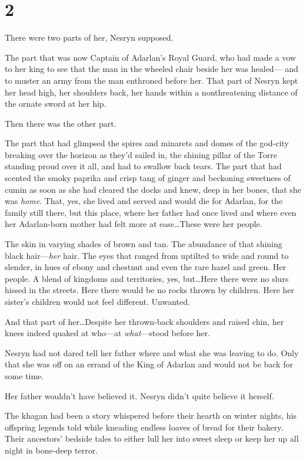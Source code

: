 
\chapter{2}

There were two parts of her, Nesryn supposed.

The part that was now Captain of Adarlan's Royal Guard, who had made a vow to her king to see that the man in the wheeled chair beside her was healed--- and to muster an army from the man enthroned before her.
That part of Nesryn kept her head high, her shoulders back, her hands within a nonthreatening distance of the ornate sword at her hip.

Then there was the other part.

The part that had glimpsed the spires and minarets and domes of the god-city breaking over the horizon as they'd sailed in, the shining pillar of the Torre standing proud over it all, and had to swallow back tears.
The part that had scented the smoky paprika and crisp tang of ginger and beckoning sweetness of cumin as soon as she had cleared the docks and knew, deep in her bones, that she was \emph{home}.
That, yes, she lived and served and would die for Adarlan, for the family still there, but this place, where her father had once lived and where even her Adarlan-born mother had felt more at ease\ldots These were her people.

The skin in varying shades of brown and tan.
The abundance of that shining black hair---\emph{her} hair.
The eyes that ranged from uptilted to wide and round to slender, in hues of ebony and chestnut and even the rare hazel and green.
Her people.
A blend of kingdoms and territories, yes, but\ldots Here there were no slurs hissed in the streets.
Here there would be no rocks thrown by children.
Here her sister's children would not feel different.
Unwanted.

And that part of her\ldots Despite her thrown-back shoulders and raised chin, her knees indeed quaked at who---at \emph{what}---stood before her.

Nesryn had not dared tell her father where and what she was leaving to do.
Only that she was off on an errand of the King of Adarlan and would not be back for some time.

Her father wouldn't have believed it.
Nesryn didn't quite believe it herself.

The khagan had been a story whispered before their hearth on winter nights, his offspring legends told while kneading endless loaves of bread for their bakery.
Their ancestors' bedside tales to either lull her into sweet sleep or keep her up all night in bone-deep terror.

